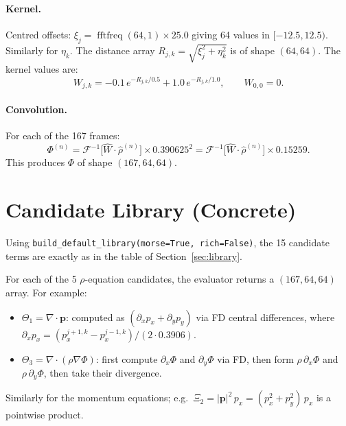 \documentclass[11pt, letterpaper]{article}
\theoremstyle{definition}
\newcommand{\vp}{\mathbf{p}}
\newcommand{\divop}{\nabla\!\cdot}
\newcommand{\grad}{\nabla}
\DeclareMathOperator{\fftfreq}{fftfreq}
\begin{document}
\paragraph{Kernel.}
Centred offsets: $\xi_j = \fftfreq(64, 1) \times 25.0$ giving 64
values in $[-12.5, 12.5)$.  Similarly for $\eta_k$.  The distance
array $R_{j,k} = \sqrt{\xi_j^{2} + \eta_k^{2}}$ is of shape
$(64, 64)$.  The kernel values are:
\begin{equation}
  W_{j,k} = -0.1\, e^{-R_{j,k}/0.5} + 1.0\, e^{-R_{j,k}/1.0},
  \qquad W_{0,0} = 0.
\end{equation}

\paragraph{Convolution.}
For each of the 167 frames:
\begin{equation}
  \Phi^{(n)} = \mathcal{F}^{-1}\!\bigl[\hat{W} \cdot \hat{\rho}^{(n)}\bigr]
  \times 0.390625^{2}
  = \mathcal{F}^{-1}\!\bigl[\hat{W} \cdot \hat{\rho}^{(n)}\bigr]
  \times 0.15259.
\end{equation}
This produces $\Phi$ of shape $(167, 64, 64)$.

\section{Candidate Library (Concrete)}
\label{sec:concrete-library}

Using \texttt{build\_default\_library(morse=True, rich=False)}, the
15 candidate terms are exactly as in the table of
Section~\ref{sec:library}.

For each of the 5 $\rho$-equation candidates, the evaluator returns a
$(167, 64, 64)$ array.  For example:
\begin{itemize}[nosep]
  \item $\Theta_1 = \divop\vp$: computed as
    $(\partial_x p_x + \partial_y p_y)$ via FD central differences,
    where $\partial_x p_x = (p_{x}^{j+1,k} - p_{x}^{j-1,k})/(2\cdot 0.3906)$.
  \item $\Theta_3 = \divop(\rho\grad\Phi)$: first compute
    $\partial_x\Phi$ and $\partial_y\Phi$ via FD, then form
    $\rho\,\partial_x\Phi$ and $\rho\,\partial_y\Phi$, then take
    their divergence.
\end{itemize}

Similarly for the momentum equations; e.g.\
$\Xi_2 = |\vp|^{2}\,p_x = (p_x^{2} + p_y^{2})\,p_x$ is a pointwise
product.
\end{document}
